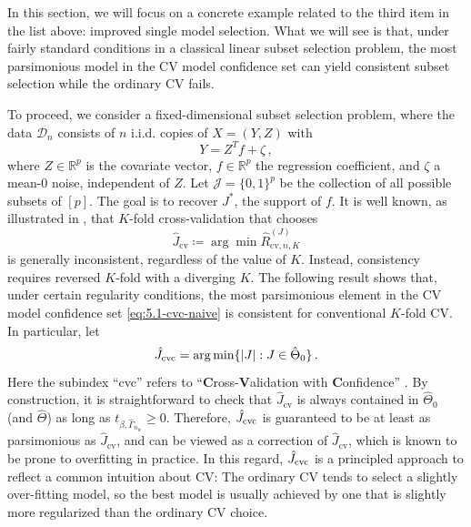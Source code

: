 \documentclass[11pt]{article}
\theoremstyle{plain}
\newcommand{\cv}{{\mathrm{cv}}}
\newcommand{\tr}{{\mathrm{tr}}}
\newcommand{\D}{{\mathcal{D}}}
\begin{document}
In this section, we will focus on a concrete example related to the third item in the list above: improved single model selection.  What we will see is that, under fairly standard conditions in a classical linear subset selection problem, the most parsimonious model in the CV model confidence set can yield consistent subset selection while the ordinary CV fails.  

To proceed, we consider a fixed-dimensional subset selection problem, where the data $\D_n$ consists of $n$ i.i.d. copies of $X=(Y,Z)$ with
$$Y=Z^T f + \zeta\,,$$
where $Z\in\mathbb R^p$ is the covariate vector, $f\in\mathbb R^p$ the regression coefficient, and $\zeta$ a mean-$0$ noise, independent of $Z$.
Let $\mathcal J=\{0,1\}^p$ be the collection of all possible subsets of $[p]$. 
The goal is to recover $J^*$, the support of $f$.  It is well known, as illustrated in , that $K$-fold cross-validation that chooses $$\hat J_{\cv}\coloneqq\arg\min \hat R_{\cv,n,K}^{(J)}$$ is generally inconsistent, regardless of the value of $K$.  Instead, consistency requires reversed $K$-fold with a diverging $K$.  The following result shows that, under certain regularity conditions, the most parsimonious element in the CV model confidence set \eqref{eq:5.1-cvc-naive} is consistent for conventional $K$-fold CV.  In particular, let
$$
\hat J_{\rm cvc} = \arg\min\{|J|:J\in\hat\Theta_0\}\,.
$$
Here the subindex ``cvc'' refers to ``\textbf{C}ross-\textbf{V}alidation with \textbf{C}onfidence'' \citep{lei2020cross}.  By construction, it is straightforward to check that $\hat J_{\cv}$ is always contained in $\hat\Theta_0$ (and $\hat\Theta$) as long as $t_{\beta,\hat\Gamma_{n_\tr}}\ge 0$.  Therefore, $\hat J_{\rm cvc}$ is guaranteed to be at least as parsimonious as $\hat J_{\cv}$, and can be viewed as a correction of $\hat J_{\cv}$, which is known to be prone to overfitting in practice. In this regard, $\hat J_{\rm cvc}$ is a principled approach to reflect a common intuition about CV: The ordinary CV tends to select a slightly over-fitting model, so the best model is usually achieved by one that is slightly more regularized than the ordinary CV choice.
\end{document}
